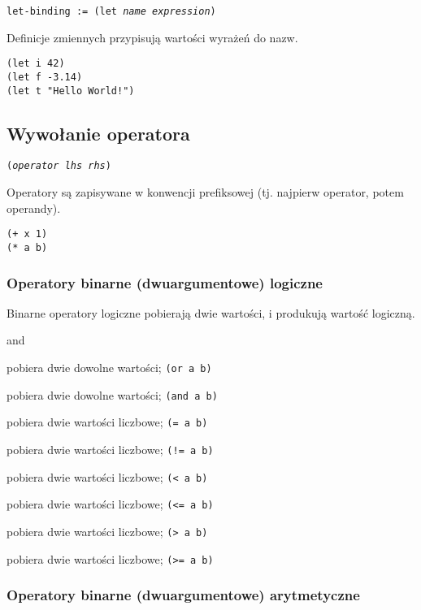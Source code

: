 \texttt{let-binding := (let \emph{name} \emph{expression})}
\vspace{1em}

Definicje zmiennych przypisują wartości wyrażeń do nazw.

\begin{lstlisting}
(let i 42)
(let f -3.14)
(let t "Hello World!")
\end{lstlisting}

\subsection{Wywołanie operatora}

\texttt{(\emph{operator} \emph{lhs} \emph{rhs})}
\vspace{1em}

Operatory są zapisywane w konwencji prefiksowej (tj. najpierw operator, potem operandy).

\begin{lstlisting}
(+ x 1)
(* a b)
\end{lstlisting}

\subsubsection{Operatory binarne (dwuargumentowe) logiczne}

Binarne operatory logiczne pobierają dwie wartości, i produkują wartość logiczną.

\begin{labeling}{and}
    \item[\texttt{or}] pobiera dwie dowolne wartości; \texttt{(or a b)}
    \item[\texttt{and}] pobiera dwie dowolne wartości; \texttt{(and a b)}
    \item[\texttt{=}] pobiera dwie wartości liczbowe; \texttt{(= a b)}
    \item[\texttt{!=}] pobiera dwie wartości liczbowe; \texttt{(!= a b)}
    \item[\texttt{<}] pobiera dwie wartości liczbowe; \texttt{(< a b)}
    \item[\texttt{<=}] pobiera dwie wartości liczbowe; \texttt{(<= a b)}
    \item[\texttt{>}] pobiera dwie wartości liczbowe; \texttt{(> a b)}
    \item[\texttt{>=}] pobiera dwie wartości liczbowe; \texttt{(>= a b)}
\end{labeling}

\subsubsection{Operatory binarne (dwuargumentowe) arytmetyczne}

